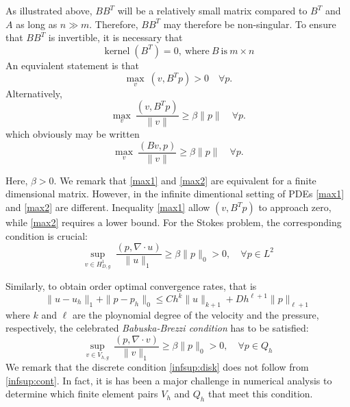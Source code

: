 As illustrated above, $B B^T$ will be a relatively small matrix compared to
$B^T$ and $A$ as long as $n  \gg m$. Therefore, $B B^T$  may therefore be non-singular.
To ensure that $B B^T$ is invertible, it is necessary that
\[\operatorname{kernel}(B^T)=0,\ \textrm{where}\ B \ \textrm{is}\ m\times n\]
An equvialent statement is that
\begin{equation}
\max_v\ (v,B^Tp) > 0\quad \forall p .
\label{max1}
\end{equation}
Alternatively,
\begin{equation}
\max_v\ \frac{(v,B^Tp)}{\|v\| } \ge \beta \|p\| \quad \forall p.
\label{max2}
\end{equation}
which obviously may be written 
\begin{equation}
\max_v\ \frac{(B v,p)}{\|v\| } \ge \beta \|p\| \quad \forall p.
\label{max22}
\end{equation}

Here, $\beta > 0$. We remark that \eqref{max1} and \eqref{max2} are equivalent for a finite dimensional matrix.
However, in the infinite dimentional setting of PDEs \eqref{max1} and \eqref{max2} are different.
Inequality \eqref{max1} allow $(v, B^T p)$ to approach zero, while \eqref{max2} requires a lower bound.
For the Stokes problem, the corresponding condition is crucial:
\begin{equation}
\sup_{v\in H^1_{D,g}}\ \frac{(p, \nabla\cdot u) }{\|u\|_1\ } \ge \beta \|p\|_0 > 0, \quad  \forall p\in L^2
\label{infsup:cont}
\end{equation}

Similarly, to obtain order optimal convergence rates, that is
\[\|u-u_h\|_1 + \|p-p_h\|_0 \le Ch^k\|u\|_{k+1} + Dh^{\ell+1}\|p\|_{\ell+1}\]
where $k$ and $\ell$ are the ploynomial degree of the velocity and the pressure, respectively,
the celebrated \emph{Babuska-Brezzi condition} has to be satisfied:
\begin{equation}
\sup_{v\in V_{h,g}}\ \frac{(p, \nabla\cdot v) }{\|v\|_1\ } \ge \beta \|p\|_0 > 0, \quad  \forall p\in Q_h
\label{infsup:disk}
\end{equation}
We remark that the discrete condition \eqref{infsup:disk} does not follow from \eqref{infsup:cont}.
In fact, it is has been a major challenge in numerical analysis
to determine which finite element pairs $V_h$ and $Q_h$ that meet this condition.

